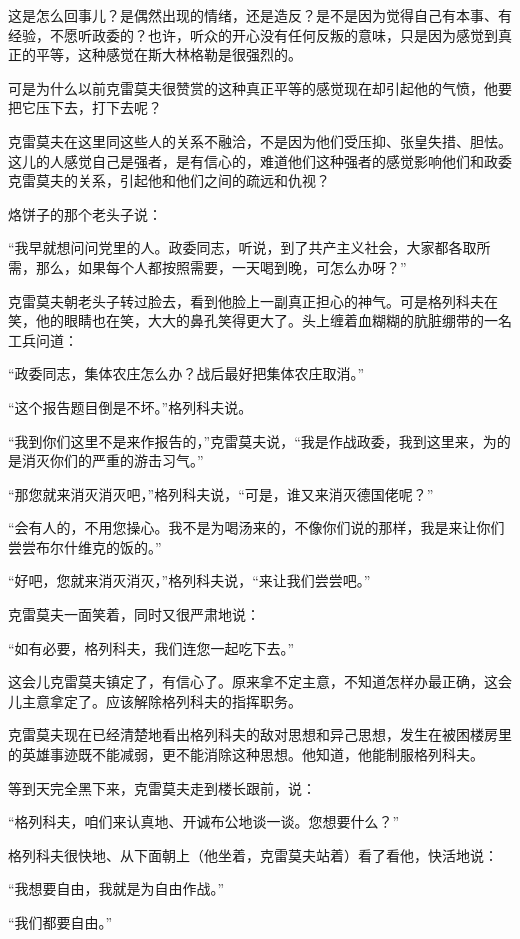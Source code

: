 这是怎么回事儿？是偶然出现的情绪，还是造反？是不是因为觉得自己有本事、有经验，不愿听政委的？也许，听众的开心没有任何反叛的意味，只是因为感觉到真正的平等，这种感觉在斯大林格勒是很强烈的。

可是为什么以前克雷莫夫很赞赏的这种真正平等的感觉现在却引起他的气愤，他要把它压下去，打下去呢？

克雷莫夫在这里同这些人的关系不融洽，不是因为他们受压抑、张皇失措、胆怯。这儿的人感觉自己是强者，是有信心的，难道他们这种强者的感觉影响他们和政委克雷莫夫的关系，引起他和他们之间的疏远和仇视？

烙饼子的那个老头子说：

“我早就想问问党里的人。政委同志，听说，到了共产主义社会，大家都各取所需，那么，如果每个人都按照需要，一天喝到晚，可怎么办呀？”

克雷莫夫朝老头子转过脸去，看到他脸上一副真正担心的神气。可是格列科夫在笑，他的眼睛也在笑，大大的鼻孔笑得更大了。头上缠着血糊糊的肮脏绷带的一名工兵问道：

“政委同志，集体农庄怎么办？战后最好把集体农庄取消。”

“这个报告题目倒是不坏。”格列科夫说。

“我到你们这里不是来作报告的，”克雷莫夫说，“我是作战政委，我到这里来，为的是消灭你们的严重的游击习气。”

“那您就来消灭消灭吧，”格列科夫说，“可是，谁又来消灭德国佬呢？”

“会有人的，不用您操心。我不是为喝汤来的，不像你们说的那样，我是来让你们尝尝布尔什维克的饭的。”

“好吧，您就来消灭消灭，”格列科夫说，“来让我们尝尝吧。”

克雷莫夫一面笑着，同时又很严肃地说：

“如有必要，格列科夫，我们连您一起吃下去。”

这会儿克雷莫夫镇定了，有信心了。原来拿不定主意，不知道怎样办最正确，这会儿主意拿定了。应该解除格列科夫的指挥职务。

克雷莫夫现在已经清楚地看出格列科夫的敌对思想和异己思想，发生在被困楼房里的英雄事迹既不能减弱，更不能消除这种思想。他知道，他能制服格列科夫。

等到天完全黑下来，克雷莫夫走到楼长跟前，说：

“格列科夫，咱们来认真地、开诚布公地谈一谈。您想要什么？”

格列科夫很快地、从下面朝上（他坐着，克雷莫夫站着）看了看他，快活地说：

“我想要自由，我就是为自由作战。”

“我们都要自由。”

